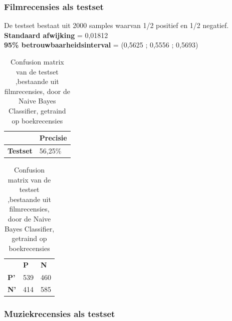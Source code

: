 \subsubsection{Filmrecensies als testset}\label{Filmrecensies als testset}

De testset bestaat uit 2000 samples waarvan 1/2 positief en 1/2 negatief.
\newline
\textbf{Standaard afwijking} = 0,01812\\
\textbf{95\% betrouwbaarheidsinterval} = (0,5625 ; 0,5556 ; 0,5693)\\
 
\begin{table}[h]
\centering
\setlength\tabcolsep{4pt}
\begin{minipage}{0.48\textwidth}
\centering
\begin{tabular}{l|l|}
\cline{2-2}
                                            & \textbf{Precisie} \\ \hline
\multicolumn{1}{|l|}{\textbf{Testset}}      & 56,25\%           \\ \hline
\end{tabular}
\caption{Classificatieprecisie Naive Bayes Classifier, getraind op boekrecensies, getest op filmrecensies}
\end{minipage}%
\hfill
\begin{minipage}{0.48\textwidth}
\centering
\begin{tabular}{lll}
                                 & \textbf{P}               & \textbf{N}               \\ \cline{2-3} 
\multicolumn{1}{l|}{\textbf{P'}} & \multicolumn{1}{l|}{539} & \multicolumn{1}{l|}{460} \\ \cline{2-3} 
\multicolumn{1}{l|}{\textbf{N'}} & \multicolumn{1}{l|}{414} & \multicolumn{1}{l|}{585} \\ \cline{2-3} 
\end{tabular}
\caption{Confusion matrix van de testset ,bestaande uit filmrecensies, door de  Naive Bayes Classifier, getraind op boekrecensies} 
\end{minipage}
\end{table}

\subsubsection{Muziekrecensies als testset}\label{Muziekrecensies als testset}

